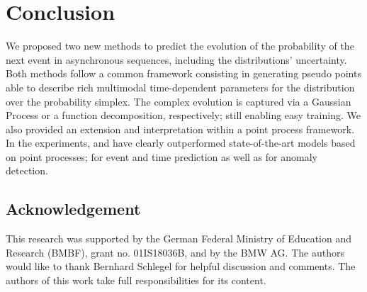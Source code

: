 \section{Conclusion}


We proposed two new methods to predict the evolution of the probability of the next event in asynchronous sequences, including the distributions' uncertainty. Both methods follow a common framework consisting in generating pseudo points able to describe rich multimodal time-dependent parameters for the distribution over the probability simplex. The complex evolution is captured via a Gaussian Process or a function decomposition, respectively; still enabling easy training. We also provided an extension and interpretation within a point process framework. In the experiments, \GPModel and \DirModel have clearly outperformed state-of-the-art models based on point processes; for event and time prediction as well as for anomaly detection.

\subsection*{Acknowledgement}
This research was supported by the German Federal Ministry of Education and Research (BMBF), grant no. 01IS18036B, and by the BMW AG. The authors would like to thank Bernhard Schlegel for helpful discussion and comments. The authors of this work take full responsibilities for its content.
